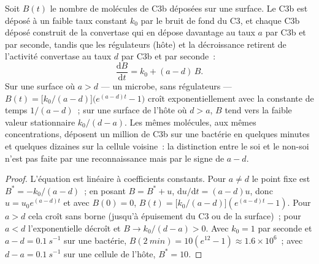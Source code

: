 \begin{theorem}\label{thm:b3:innate-immunity:complement}
Soit $B(t)$ le nombre de molécules de C3b déposées sur une surface. Le
C3b est déposé à un faible taux constant $k_{0}$ par le bruit de fond du
C3, et chaque C3b déposé construit de la convertase qui en dépose
davantage au taux $a$ par C3b et par seconde, tandis que les régulateurs
(hôte) et la décroissance retirent de l'activité convertase au taux $d$
par C3b et par seconde~:
\[
\frac{\mathrm{d}B}{\mathrm{d}t} = k_{0} + (a - d)\,B .
\]
Sur une surface où $a > d$ --- un microbe, sans régulateurs ---
$B(t) = \bigl[k_{0}/(a-d)\bigr]\bigl(e^{(a-d)t} - 1\bigr)$ croît
exponentiellement avec la constante de temps $1/(a - d)$~; sur une
surface de l'hôte où $d > a$, $B$ tend vers la faible valeur
stationnaire $k_{0}/(d - a)$. Les mêmes molécules, aux mêmes
concentrations, déposent un million de C3b sur une bactérie en quelques
minutes et quelques dizaines sur la cellule voisine~: la distinction
entre le soi et le non-soi n'est pas faite par une reconnaissance mais
par le signe de $a - d$.
\end{theorem}
\begin{proof}
L'équation est linéaire à coefficients constants. Pour $a \ne d$ le
point fixe est $B^{*} = -k_{0}/(a-d)$~; en posant $B = B^{*} + u$,
$\mathrm{d}u/\mathrm{d}t = (a-d)u$, donc $u = u_{0}e^{(a-d)t}$ et avec
$B(0) = 0$, $B(t) = \bigl[k_{0}/(a-d)\bigr](e^{(a-d)t} - 1)$. Pour $a > d$
cela croît sans borne (jusqu'à épuisement du C3 ou de la surface)~; pour
$a < d$ l'exponentielle décroît et $B \to k_{0}/(d-a) > 0$. Avec
$k_{0} = 1$ par seconde et $a - d = \qty{0.1}{s^{-1}}$ sur une bactérie,
$B(\qty{2}{min})
= 10(e^{12} - 1) \approx 1.6\times 10^{6}$~; avec $d - a =
\qty{0.1}{s^{-1}}$ sur une cellule de l'hôte, $B^{*} = 10$.
\end{proof}

